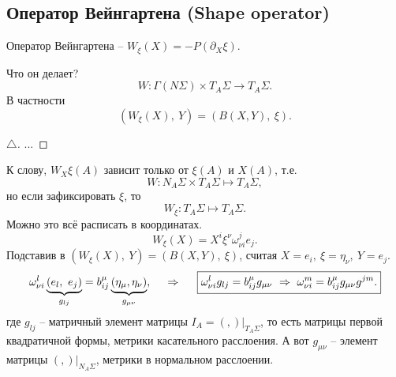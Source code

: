 \subsection{Оператор Вейнгартена (Shape operator)}

\begin{to_def} 
    Оператор Вейнгартена -- $W_\xi (X) = - P(\partial_X \xi)$.
\end{to_def}

Что он делает?
\begin{equation*}
    W \colon \Gamma(N\Sigma) \times T_A \Sigma \to T_A \Sigma.
\end{equation*}
В частности
\begin{equation*}
    \left(W_{\xi} (X), \ Y\right) = \left(B(X, Y), \ \xi\right).
\end{equation*}

\begin{proof}[$\triangle$]
    ...
\end{proof}

К слову, $W_X \xi (A)$  зависит только от $\xi(A)$ и $X(A)$, т.е.
\begin{equation*}
    W\colon N_A \Sigma \times T_A \Sigma \mapsto T_A \Sigma,
\end{equation*}
но если зафиксировать $\xi$, то
\begin{equation*}
    W_\xi \colon T_A \Sigma \mapsto T_A \Sigma.
\end{equation*}
Можно это всё расписать в координатах. 
\begin{equation*}
    W_\xi (X) = X^i \xi^\nu \omega_{\nu i}^j e_j.
\end{equation*}
Подставив в $\left(W_\xi (X),\ Y\right) = \left(B(X, Y), \ \xi\right)$, считая $X = e_i, \ \xi = \eta_\nu, \ Y = e_j$. 
\begin{equation*}
    \omega_{\nu i}^l 
    \underbrace{\left(e_l , \ e_j\right)}_{g_{lj}} 
    =
    b_{ij}^\mu 
    \underbrace{\left(\eta_\mu, \eta_\nu\right)}_{g_{\mu \nu}}
    ,
    \hspace{0.5cm} \Rightarrow \hspace{0.5cm} 
    \boxed{
        \omega_{\nu i}^l g_{lj} = b_{ij}^\mu g_{\mu \nu}
        \ \Rightarrow \ 
        \omega_{\nu i}^m = b_{ij}^\mu g_{\mu \nu} g^{j m}.
    }
\end{equation*}
где $g_{lj}$ -- матричный элемент матрицы $I_A = \left(,\right) \big|_{T_A \Sigma}$, то есть матрицы первой квадратичной формы, метрики касательного расслоения. А вот $g_{\mu \nu}$ -- элемент матрицы $(,)  \big|_{N_A \Sigma}$, метрики в  нормальном расслоении. 


